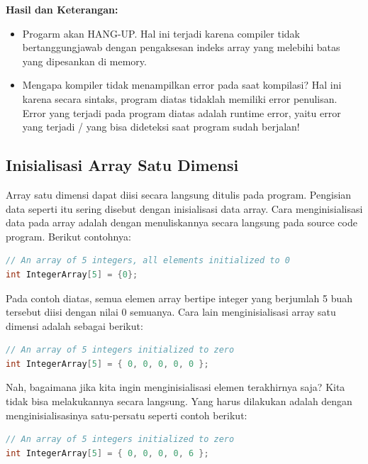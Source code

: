 \textbf{Hasil dan Keterangan:}

\begin{itemize}

\item
  Progarm akan HANG-UP. Hal ini terjadi karena compiler tidak
  bertanggungjawab dengan pengaksesan indeks array yang melebihi batas
  yang dipesankan di memory.
\item
  Mengapa kompiler tidak menampilkan error pada saat kompilasi? Hal ini
  karena secara sintaks, program diatas tidaklah memiliki error
  penulisan. Error yang terjadi pada program diatas adalah runtime
  error, yaitu error yang terjadi / yang bisa dideteksi saat program
  sudah berjalan!
\end{itemize}

\subsection{Inisialisasi Array Satu Dimensi}\label{inisialisasi-array-satu-dimensi}

Array satu dimensi dapat diisi secara langsung ditulis pada program.
Pengisian data seperti itu sering disebut dengan inisialisasi data
array. Cara menginisialisasi data pada array adalah dengan menuliskannya
secara langsung pada source code program. Berikut contohnya:

\begin{lstlisting}[language=c++, numbers=none]
// An array of 5 integers, all elements initialized to 0
int IntegerArray[5] = {0};
\end{lstlisting}

Pada contoh diatas, semua elemen array bertipe integer yang berjumlah 5
buah tersebut diisi dengan nilai 0 semuanya. Cara lain menginisialisasi
array satu dimensi adalah sebagai berikut:

\begin{lstlisting}[language=c++, numbers=none]
// An array of 5 integers initialized to zero
int IntegerArray[5] = { 0, 0, 0, 0, 0 };
\end{lstlisting}

Nah, bagaimana jika kita ingin menginisialisasi elemen terakhirnya saja?
Kita tidak bisa melakukannya secara langsung. Yang harus dilakukan
adalah dengan menginisialisasinya satu-persatu seperti contoh berikut:

\begin{lstlisting}[language=c++, numbers=none]
// An array of 5 integers initialized to zero
int IntegerArray[5] = { 0, 0, 0, 0, 6 };
\end{lstlisting}

